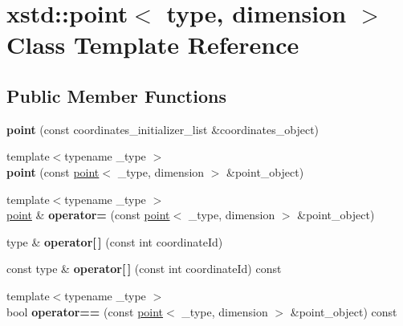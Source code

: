 \hypertarget{classxstd_1_1point}{\section{xstd\-:\-:point$<$ type, dimension $>$ Class Template Reference}
\label{classxstd_1_1point}
}
\subsection*{Public Member Functions}
\begin{DoxyCompactItemize}
\item 
\hypertarget{classxstd_1_1point_a31b7e462164c6071b3847b0ad0604ef0}{{\bfseries point} (const coordinates\-\_\-initializer\-\_\-list \&coordinates\-\_\-object)}\label{classxstd_1_1point_a31b7e462164c6071b3847b0ad0604ef0}

\item 
\hypertarget{classxstd_1_1point_a3895117f5b9d43c53a8da93528aba6f5}{{\footnotesize template$<$typename \-\_\-type $>$ }\\{\bfseries point} (const \hyperlink{classxstd_1_1point}{point}$<$ \-\_\-type, dimension $>$ \&point\-\_\-object)}\label{classxstd_1_1point_a3895117f5b9d43c53a8da93528aba6f5}

\item 
\hypertarget{classxstd_1_1point_a67d8aba62c4ebe7cf114a276e30336f2}{{\footnotesize template$<$typename \-\_\-type $>$ }\\\hyperlink{classxstd_1_1point}{point} \& {\bfseries operator=} (const \hyperlink{classxstd_1_1point}{point}$<$ \-\_\-type, dimension $>$ \&point\-\_\-object)}\label{classxstd_1_1point_a67d8aba62c4ebe7cf114a276e30336f2}

\item 
\hypertarget{classxstd_1_1point_aaf46d8e0e0676b0fb5e8d86a7742e2a1}{type \& {\bfseries operator\mbox{[}$\,$\mbox{]}} (const int coordinate\-Id)}\label{classxstd_1_1point_aaf46d8e0e0676b0fb5e8d86a7742e2a1}

\item 
\hypertarget{classxstd_1_1point_a39217029d54ae1c115cc79db3edc1e48}{const type \& {\bfseries operator\mbox{[}$\,$\mbox{]}} (const int coordinate\-Id) const }\label{classxstd_1_1point_a39217029d54ae1c115cc79db3edc1e48}

\item 
\hypertarget{classxstd_1_1point_a2f98209745efac5775e14315b58d5a1d}{{\footnotesize template$<$typename \-\_\-type $>$ }\\bool {\bfseries operator==} (const \hyperlink{classxstd_1_1point}{point}$<$ \-\_\-type, dimension $>$ \&point\-\_\-object) const }\label{classxstd_1_1point_a2f98209745efac5775e14315b58d5a1d}


\end{DoxyCompactItemize}
